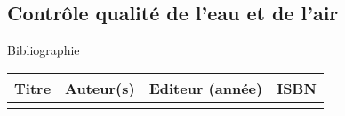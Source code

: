 \begin{headerBlock}
\chapter{Contrôle qualité de l'eau et de l'air}
\label{LC_ControleQualite}
 \end{headerBlock}



\begin{reportBlock}{Bibliographie}

\begin{center}
\begin{tabularx}{\textwidth}{| X | X | c | c |}\hline
Titre & Auteur(s) & Editeur (année) & ISBN \\ \hline
 &  &  &  \\ 
 \hline
\end{tabularx}
\end{center}

\end{reportBlock}

